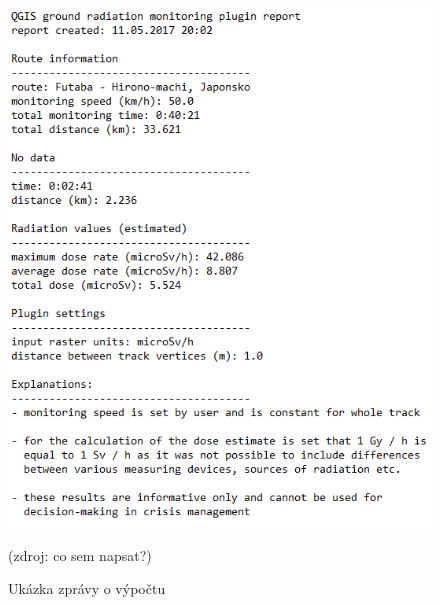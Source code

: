 \begin{enumerate}
\begin{itemize}
		\end{itemize}
	
			\begin{figure}[H]
    			\centering
      			\includegraphics[scale=0.8]{./pictures/report.png}
      				\caption[Ukázka zprávy o výpočtu]{Ukázka zprávy o výpočtu}(zdroj: co sem napsat?)
     				\label{fig:report}
  			\end{figure}
  			

\end{enumerate}
